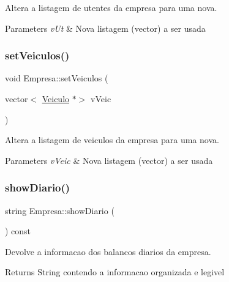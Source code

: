 Altera a listagem de utentes da empresa para uma nova. 


\begin{DoxyParams}{Parameters}
{\em v\+Ut} & Nova listagem (vector) a ser usada \\
\hline
\end{DoxyParams}
\mbox{\label{class_empresa_a6e492b399a9e3362ed1b50fb05bb36b5}} 
\subsubsection{\texorpdfstring{set\+Veiculos()}{setVeiculos()}}
{\footnotesize\ttfamily void Empresa\+::set\+Veiculos (\begin{DoxyParamCaption}\item[{vector$<$ \mbox{\hyperlink{class_veiculo}{Veiculo}} $\ast$$>$}]{v\+Veic }\end{DoxyParamCaption})}



Altera a listagem de veiculos da empresa para uma nova. 


\begin{DoxyParams}{Parameters}
{\em v\+Veic} & Nova listagem (vector) a ser usada \\
\hline
\end{DoxyParams}
\mbox{\label{class_empresa_a3c7180cf55b876478c0774055f2cfd31}} 
\subsubsection{\texorpdfstring{show\+Diario()}{showDiario()}}
{\footnotesize\ttfamily string Empresa\+::show\+Diario (\begin{DoxyParamCaption}{ }\end{DoxyParamCaption}) const}



Devolve a informacao dos balancos diarios da empresa. 

\begin{DoxyReturn}{Returns}
String contendo a informacao organizada e legivel 
\end{DoxyReturn}
\mbox{\label{class_empresa_a3dbd5fca995d27f9911d5e694e01c76e}} 

